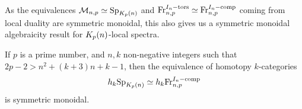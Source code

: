 As the equivalences $\mathcal{M}_{n,p} \simeq \mathrm{Sp}_{K_p(n)}$ and $\mathrm{Fr}_{n,p}^{I_n-\mathrm{tors}} \simeq \mathrm{Fr}_{n,p}^{I_n-\mathrm{comp}}$ coming from local duality are symmetric monoidal, this also gives us a symmetric monoidal algebraicity result for ${K_p(n)}$-local spectra. 

\begin{corollary}
    If $p$ is a prime number, and $n, k$ non-negative integers such that $2p-2>n^2+(k+3)n+k-1$, then the equivalence of homotopy $k$-categories
    \[h_k \mathrm{Sp}_{K_p(n)}\simeq h_k \mathrm{Fr}_{n,p}^{I_n-\mathrm{comp}}\]
    is symmetric monoidal. 
\end{corollary}
